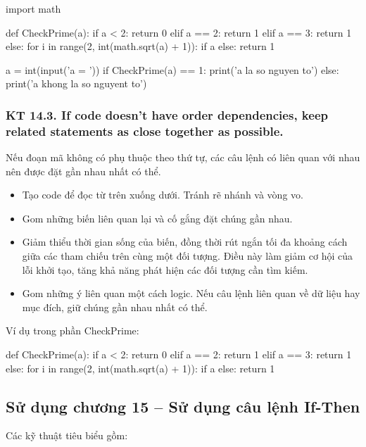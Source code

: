 \documentclass[12pt]{report}
\begin{document}
\begin{python}
import math

def CheckPrime(a):
	if a < 2: return 0
	elif a == 2: return 1
	elif a == 3: return 1
	else:
		for i in range(2, int(math.sqrt(a) + 1)):
			if a %
			else: return 1

a = int(input('a = '))
if CheckPrime(a) == 1:
	print('a la so nguyen to')
else:
	print('a khong la so nguyent to')
\end{python}


\subsubsection{KT 14.3. If code doesn't have order dependencies, keep related statements as close together as possible.}
Nếu đoạn mã không có phụ thuộc theo thứ tự, các câu lệnh có liên quan với nhau nên được đặt gần nhau nhất có thể.
\begin{itemize}
	\item Tạo code để đọc từ trên xuống dưới. Tránh rẽ nhánh và vòng vo.
	\item Gom những biến liên quan lại và cố gắng đặt chúng gần nhau.
	\item Giảm thiểu thời gian sống của biến, đồng thời rút ngắn tối đa khoảng cách giữa các tham chiếu trên cùng một đối tượng. Điều này làm giảm cơ hội của lỗi khởi tạo, tăng khả năng phát hiện các đối tượng cần tìm kiếm.
	\item Gom những ý liên quan một cách logic. Nếu câu lệnh liên quan về dữ liệu hay mục đích, giữ chúng gần nhau nhất có thể.
\end{itemize}

Ví dụ trong phần CheckPrime: 
\begin{python}
def CheckPrime(a):
	if a < 2: return 0
	elif a == 2: return 1
	elif a == 3: return 1
	else:
		for i in range(2, int(math.sqrt(a) + 1)):
			if a %
			else: return 1
\end{python}

\subsection{Sử dụng chương 15 – Sử dụng câu lệnh If-Then}
\noindent Các kỹ thuật tiêu biểu gồm: 
\end{document}

